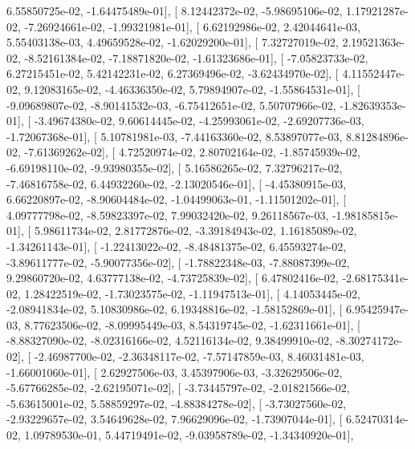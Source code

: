\documentclass{article}
\begin{document}
          6.55850725e-02,  -1.64475489e-01],
       [  8.12442372e-02,  -5.98695106e-02,   1.17921287e-02,
         -7.26924661e-02,  -1.99321981e-01],
       [  6.62192986e-02,   2.42044641e-03,   5.55403138e-03,
          4.49659528e-02,  -1.62029200e-01],
       [  7.32727019e-02,   2.19521363e-02,  -8.52161384e-02,
         -7.18871820e-02,  -1.61323686e-01],
       [ -7.05823733e-02,   6.27215451e-02,   5.42142231e-02,
          6.27369496e-02,  -3.62434970e-02],
       [  4.11552447e-02,   9.12083165e-02,  -4.46336350e-02,
          5.79894907e-02,  -1.55864531e-01],
       [ -9.09689807e-02,  -8.90141532e-03,  -6.75412651e-02,
          5.50707966e-02,  -1.82639353e-01],
       [ -3.49674380e-02,   9.60614445e-02,  -4.25993061e-02,
         -2.69207736e-03,  -1.72067368e-01],
       [  5.10781981e-03,  -7.44163360e-02,   8.53897077e-03,
          8.81284896e-02,  -7.61369262e-02],
       [  4.72520974e-02,   2.80702164e-02,  -1.85745939e-02,
         -6.69198110e-02,  -9.93980355e-02],
       [  5.16586265e-02,   7.32796217e-02,  -7.46816758e-02,
          6.44932260e-02,  -2.13020546e-01],
       [ -4.45380915e-03,   6.66220897e-02,  -8.90604484e-02,
         -1.04499063e-01,  -1.11501202e-01],
       [  4.09777798e-02,  -8.59823397e-02,   7.99032420e-02,
          9.26118567e-03,  -1.98185815e-01],
       [  5.98611734e-02,   2.81772876e-02,  -3.39184943e-02,
          1.16185089e-02,  -1.34261143e-01],
       [ -1.22413022e-02,  -8.48481375e-02,   6.45593274e-02,
         -3.89611777e-02,  -5.90077356e-02],
       [ -1.78822348e-03,  -7.88087399e-02,   9.29860720e-02,
          4.63777138e-02,  -4.73725839e-02],
       [  6.47802416e-02,  -2.68175341e-02,   1.28422519e-02,
         -1.73023575e-02,  -1.11947513e-01],
       [  4.14053445e-02,  -2.08941834e-02,   5.10830986e-02,
          6.19348816e-02,  -1.58152869e-01],
       [  6.95425947e-03,   8.77623506e-02,  -8.09995449e-03,
          8.54319745e-02,  -1.62311661e-01],
       [ -8.88327090e-02,  -8.02316166e-02,   4.52116134e-02,
          9.38499910e-02,  -8.30274172e-02],
       [ -2.46987700e-02,  -2.36348117e-02,  -7.57147859e-03,
          8.46031481e-03,  -1.66001060e-01],
       [  2.62927506e-03,   3.45397906e-03,  -3.32629506e-02,
         -5.67766285e-02,  -2.62195071e-02],
       [ -3.73445797e-02,  -2.01821566e-02,  -5.63615001e-02,
          5.58859297e-02,  -4.88384278e-02],
       [ -3.73027560e-02,  -2.93229657e-02,   3.54649628e-02,
          7.96629096e-02,  -1.73907044e-01],
       [  6.52470314e-02,   1.09789530e-01,   5.44719491e-02,
         -9.03958789e-02,  -1.34340920e-01],
\end{document}
